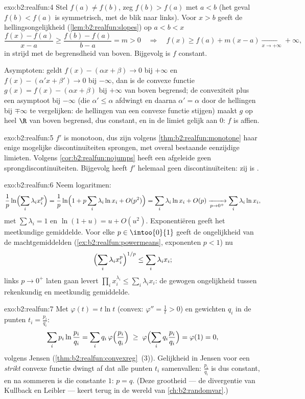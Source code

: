 \begin{solution}{exo:b2:realfun:4}
Stel $f(a) \neq f(b)$, zeg $f(b) > f(a)$ met $a < b$ (het geval
$f(b) < f(a)$ is symmetrisch, met de blik naar links). Voor $x > b$
geeft de hellingsongelijkheid (\cref{lem:b2:realfun:slopes}) op $a
< b < x$
\[
\frac{f(x) - f(a)}{x - a} \geq \frac{f(b) - f(a)}{b - a} = m > 0
\quad\Longrightarrow\quad
f(x) \geq f(a) + m(x - a) \xrightarrow[x\to+\infty]{} +\infty,
\]
in strijd met de begrensdheid van boven. Bijgevolg is $f$
constant.

Asymptoten: geldt $f(x) - (\alpha x + \beta) \to 0$ bij $+\infty$
en $f(x) - (\alpha' x + \beta') \to 0$ bij $-\infty$, dan is de
convexe functie $g(x) = f(x) - (\alpha x + \beta)$ bij $+\infty$
van boven begrensd; de convexiteit plus een asymptoot bij $-\infty$
(die $\alpha' \leq \alpha$ afdwingt en daarna $\alpha' = \alpha$
door de hellingen bij $\mp\infty$ te vergelijken: de hellingen van
een convexe functie stijgen) maakt $g$ op heel $\R$ van boven
begrensd, dus constant, en in de limiet gelijk aan $0$: $f$ is
affien.
\end{solution}

\begin{solution}{exo:b2:realfun:5}
$f'$ is monotoon, dus zijn volgens
\cref{thm:b2:realfun:monotone} haar enige mogelijke
discontinuïteiten sprongen, met overal bestaande eenzijdige
limieten. Volgens \cref{cor:b2:realfun:nojumps} heeft een afgeleide
geen sprongdiscontinuïteiten. Bijgevolg heeft $f'$ helemaal geen
discontinuïteiten: zij is .
\end{solution}

\begin{solution}{exo:b2:realfun:6}
Neem logaritmen:
\[
\frac1p \ln\Bigl(\sum_i \lambda_i x_i^p\Bigr)
= \frac1p \ln\Bigl(1 + p\sum_i \lambda_i \ln x_i +
O(p^2)\Bigr)
= \sum_i \lambda_i \ln x_i + O(p)
\xrightarrow[p \to 0^+]{} \sum_i \lambda_i \ln x_i ,
\]
met $\sum\lambda_i = 1$ en $\ln(1 + u) = u + O(u^2)$.
Exponentiëren geeft het meetkundige gemiddelde. Voor elke $p \in
\intoo{0}{1}$ geeft de ongelijkheid van de machtgemiddelden
(\cref{ex:b2:realfun:powermeans}, exponenten $p < 1$) nu
\[
\Bigl(\sum_i \lambda_i x_i^p\Bigr)^{1/p} \leq \sum_i\lambda_i x_i ;
\]
links $p \to 0^+$ laten gaan levert $\prod_i x_i^{\lambda_i} \leq
\sum_i \lambda_i x_i$: de gewogen ongelijkheid tussen rekenkundig
en meetkundig gemiddelde.
\end{solution}

\begin{solution}{exo:b2:realfun:7}
Met $\varphi(t) = t\ln t$ (convex: $\varphi'' = \frac1t > 0$) en
gewichten $q_i$ in de punten $t_i = \frac{p_i}{q_i}$:
\[
\sum_i p_i \ln\frac{p_i}{q_i}
= \sum_i q_i\, \varphi\Bigl(\frac{p_i}{q_i}\Bigr)
\;\geq\; \varphi\Bigl(\sum_i q_i \frac{p_i}{q_i}\Bigr)
= \varphi(1) = 0 ,
\]
volgens Jensen (\cref{thm:b2:realfun:convexreg}~(3)). Gelijkheid in
Jensen voor een \emph{strikt} convexe functie dwingt af dat alle
punten $t_i$ samenvallen: $\frac{p_i}{q_i}$ is dus constant, en na
sommeren is die constante $1$: $p = q$. (Deze grootheid --- de
divergentie van Kullback en Leibler --- keert terug in de wereld
van \cref{ch:b2:randomvar}.)
\end{solution}

